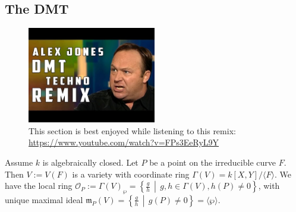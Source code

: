 \documentclass[12pt]{article}
\newcommand{\vbrack}[1]{\langle #1\rangle}
\theoremstyle{definition}
\begin{document}
\subsection{The DMT}
\begin{figure}[H]
    \centering
    \includegraphics[width=0.5\textwidth]{22.jpg}
    \caption{This section is best enjoyed while listening to this remix: \url{https://www.youtube.com/watch?v=FPs3EeRyL9Y}}
\end{figure}
Assume $k$ is algebraically closed. Let $P$ be a point on the irreducible curve $F$. Then $V:=V(F)$ is a variety with coordinate ring $\Gamma(V)=k[X,Y]/\vbrack{F}$. We have the local ring $\mathcal{O}_P:=\Gamma(V)_{\wp}=\left\{\frac{g}{h}\,\middle|\,g,h\in\Gamma(V),h(P)\neq0\right\}$, with unique maximal ideal $\mathfrak{m}_P(V)=\left\{\frac{g}{h}\,\middle|\,g(P)\neq0\right\}=\vbrack{\wp}$.
\end{document}

